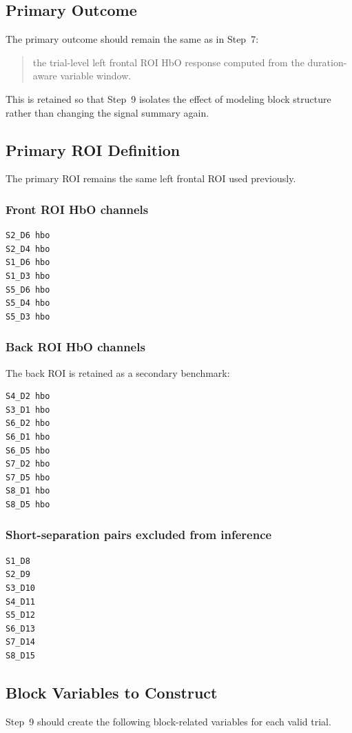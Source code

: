 \subsection{Primary Outcome}
The primary outcome should remain the same as in Step~7:
\begin{quote}
the trial-level left frontal ROI HbO response computed from the duration-aware variable window.
\end{quote}

This is retained so that Step~9 isolates the effect of modeling block structure rather than changing
the signal summary again.

\subsection{Primary ROI Definition}
The primary ROI remains the same left frontal ROI used previously.

\subsubsection{Front ROI HbO channels}
\begin{verbatim}
S2_D6 hbo
S2_D4 hbo
S1_D6 hbo
S1_D3 hbo
S5_D6 hbo
S5_D4 hbo
S5_D3 hbo
\end{verbatim}

\subsubsection{Back ROI HbO channels}
The back ROI is retained as a secondary benchmark:
\begin{verbatim}
S4_D2 hbo
S3_D1 hbo
S6_D2 hbo
S6_D1 hbo
S6_D5 hbo
S7_D2 hbo
S7_D5 hbo
S8_D1 hbo
S8_D5 hbo
\end{verbatim}

\subsubsection{Short-separation pairs excluded from inference}
\begin{verbatim}
S1_D8
S2_D9
S3_D10
S4_D11
S5_D12
S6_D13
S7_D14
S8_D15
\end{verbatim}

\subsection{Block Variables to Construct}
Step~9 should create the following block-related variables for each valid trial.

